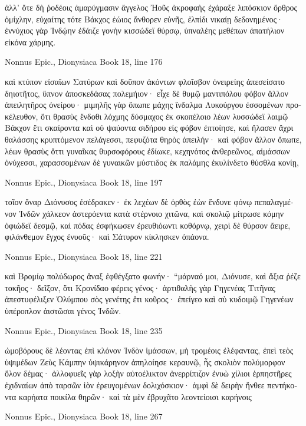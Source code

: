 \documentclass[12pt,letterpaper,twoside,final]{memoir}
\begin{document}
\begin{greek}
ἀλλ' ὅτε δὴ ῥοδέοις ἀμαρύγμασιν ἄγγελος Ἠοῦς 
ἀκροφαὴς ἐχάραξε λιπόσκιον ὄρθρος ὀμίχλην, 
εὐχαίτης τότε Βάκχος ἑώιος ἄνθορεν εὐνῆς, 
ἐλπίδι νικαίῃ δεδονημένος· ἐννύχιος γὰρ 
Ἰνδῴην ἐδάιζε γονὴν κισσώδεϊ θύρσῳ,   
ὑπναλέης μεθέπων ἀπατήλιον εἰκόνα χάρμης. 



Nonnus Epic., Dionysiaca 
Book 18, line 176

καὶ κτύπον εἰσαΐων Σατύρων καὶ δοῦπον ἀκόντων 
φλοῖσβον ὀνειρείης ἀπεσείσατο δηιοτῆτος, 
ὕπνον ἀποσκεδάσας πολεμήιον· εἶχε δὲ θυμῷ 
μαντιπόλου φόβον ἄλλον ἀπειλητῆρος ὀνείρου· 
μιμηλῆς γὰρ ὄπωπε μάχης ἴνδαλμα Λυκούργου 
ἐσσομένων προκέλευθον, ὅτι θρασὺς ἔνδοθι λόχμης 
δύσμαχος ἐκ σκοπέλοιο λέων λυσσώδεϊ λαιμῷ 
Βάκχον ἔτι σκαίροντα καὶ οὐ ψαύοντα σιδήρου 
εἰς φόβον ἐπτοίησε, καὶ ἤλασεν ἄχρι θαλάσσης 
κρυπτόμενον πελάγεσσι, πεφυζότα θηρὸς ἀπειλήν· 
καὶ φόβον ἄλλον ὄπωπε, λέων θρασὺς ὅττι γυναῖκας 
θυρσοφόρους ἐδίωκε, κεχηνότος ἀνθερεῶνος, 
αἱμάσσων ὀνύχεσσι, χαρασσομένων δὲ γυναικῶν 
μύστιδος ἐκ παλάμης ἐκυλίνδετο θύσθλα κονίῃ, 




Nonnus Epic., Dionysiaca 
Book 18, line 197

τοῖον ὄναρ Διόνυσος ἐσέδρακεν· ἐκ λεχέων δὲ 
ὀρθὸς ἐὼν ἔνδυνε φόνῳ πεπαλαγμένον Ἰνδῶν 
χάλκεον ἀστερόεντα κατὰ στέρνοιο χιτῶνα, 
καὶ σκολιῷ μίτρωσε κόμην ὀφιώδεϊ δεσμῷ, 
καὶ πόδας ἐσφήκωσεν ἐρευθιόωντι κοθόρνῳ, 
χειρὶ δὲ θύρσον ἄειρε, φιλάνθεμον ἔγχος ἐνυοῦς· 
καὶ Σάτυρον κίκλησκεν ὀπάονα. 



Nonnus Epic., Dionysiaca 
Book 18, line 221

καὶ Βρομίῳ πολύδωρος ἄναξ ἐφθέγξατο φωνήν· 
 “μάρναό μοι, Διόνυσε, καὶ ἄξια ῥέζε τοκῆος· 
δεῖξον, ὅτι Κρονίδαο φέρεις γένος· ἀρτιθαλὴς γὰρ 
Γηγενέας Τιτῆνας ἀπεστυφέλιξεν Ὀλύμπου 
σὸς γενέτης ἔτι κοῦρος· ἐπείγεο καὶ σὺ κυδοιμῷ 
Γηγενέων ὑπέροπλον ἀιστῶσαι γένος Ἰνδῶν. 



Nonnus Epic., Dionysiaca 
Book 18, line 235

ὠμοβόρους δὲ λέοντας ἐπὶ κλόνον Ἰνδὸν ἱμάσσων, 
μὴ τρομέοις ἐλέφαντας, ἐπεὶ τεὸς ὑψιμέδων Ζεὺς 
Κάμπην ὑψικάρηνον ἀπηλοίησε κεραυνῷ, 
ἧς σκολιὸν πολύμορφον ὅλον δέμας· ἀλλοφυεῖς γὰρ 
λοξὴν αὐτοέλικτον ἀνερρίπιζον ἐνυὼ 
χίλιοι ἑρπηστῆρες ἐχιδναίων ἀπὸ ταρσῶν 
ἰὸν ἐρευγομένων δολιχόσκιον· ἀμφὶ δὲ δειρὴν 
ἤνθεε πεντήκοντα καρήατα ποικίλα θηρῶν· 
καὶ τὰ μὲν ἐβρυχᾶτο λεοντείοισι καρήνοις 




Nonnus Epic., Dionysiaca 
Book 18, line 267


\end{greek}
\end{document}
